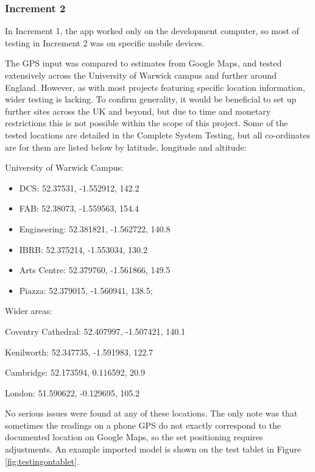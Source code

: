 \documentclass[12pt, a4paper]{article}
\begin{document}
\subsubsection{Increment 2}
In Increment 1, the app worked only on the development computer, so most of testing in Increment 2 was on specific mobile devices. 

The GPS input was compared to estimates from Google Maps, and tested extensively across the University of Warwick campus and further around England. However, as with most projects featuring specific location information, wider testing is lacking. To confirm generality, it would be beneficial to set up further sites across the UK and beyond, but due to time and monetary restrictions this is not possible within the scope of this project. Some of the tested locations are detailed in the Complete System Testing, but all co-ordinates are for them are listed below by latitude, longitude and altitude:

\begin{multicols}{2}
    \small
    University of Warwick Campus:
    \begin{itemize}
        \item DCS: 52.37531, -1.552912, 142.2
        \item FAB: 52.38073, -1.559563, 154.4
        \item Engineering: 52.381821, -1.562722, 140.8
        \item IBRB: 52.375214, -1.553034, 130.2
        \item Arts Centre: 52.379760, -1.561866, 149.5
        \item Piazza: 52.379015, -1.560941, 138.5;
    \end{itemize}
    
    Wider areas: 
    \begin{itemize}
        \item Coventry Cathedral: 52.407997, -1.507421, 140.1
        \item Kenilworth: 52.347735, -1.591983, 122.7
        \item Cambridge: 52.173594, 0.116592, 20.9 
        \item London: 51.590622, -0.129695, 105.2
        \textcolor{white}{\item} 
        \textcolor{white}{\item} 
    \end{itemize}
\end{multicols}

No serious issues were found at any of these locations. The only note was that sometimes the readings on a phone GPS do not exactly correspond to the documented location on Google Maps, so the set positioning requires adjustments. An example imported model is shown on the test tablet in Figure \ref{fig:testingontablet}.
\end{document}
